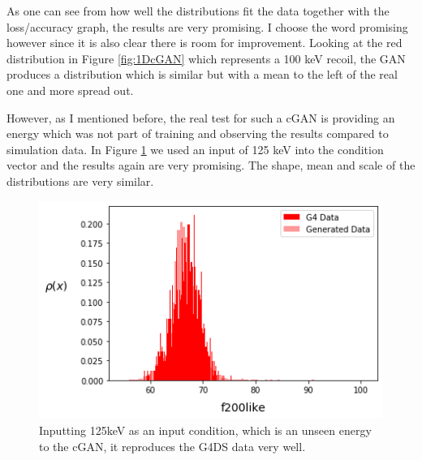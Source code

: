 \documentclass[11pt]{article} %
\begin{document}
As one can see from how well the distributions fit the data together with the loss/accuracy graph, the results are very promising. I choose the word promising however since it is also clear there is room for improvement. Looking at the red distribution in Figure \ref{fig:1DcGAN} which represents a 100 keV recoil, the GAN produces a distribution which is similar but with a mean to the left of the real one and more spread out.
\newline

However, as I mentioned before, the real test for such a cGAN is providing an energy which was not part of training and observing the results compared to simulation data. In Figure \ref{fig:1DcGANtest} we used an input of 125 keV into the condition vector and the results again are very promising. The shape, mean and scale of the distributions are very similar.

\begin{figure}[H]
\centering
\includegraphics[scale=0.5]{images/1d_conditional_f200_50kev.png}
\caption{Inputting 125keV as an input condition, which is an unseen energy to the cGAN, it reproduces the G4DS data very well.}
\label{fig:1DcGANtest}
\end{figure}
\end{document}
